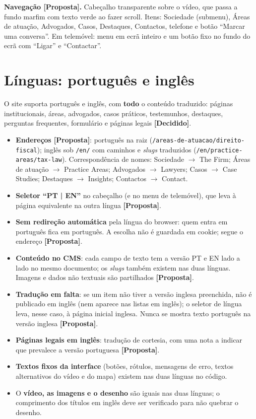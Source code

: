 \documentclass[11pt,a4paper]{article}
\newcommand{\decidido}{\textcolor{verde700}{\textbf{[Decidido]}}}
\newcommand{\proposta}{\textcolor{bronze}{\textbf{[Proposta]}}}
\begin{document}
\textbf{Navegação \proposta.} Cabeçalho transparente sobre o vídeo, que passa a fundo marfim com texto verde ao fazer scroll. Itens: Sociedade (submenu), Áreas de atuação, Advogados, Casos, Destaques, Contactos, telefone e botão ``Marcar uma conversa''. Em telemóvel: menu em ecrã inteiro e um botão fixo no fundo do ecrã com ``Ligar'' e ``Contactar''.

\section{Línguas: português e inglês}\label{sec:linguas}

O site suporta português e inglês, com \textbf{todo} o conteúdo traduzido: páginas institucionais, áreas, advogados, casos práticos, testemunhos, destaques, perguntas frequentes, formulário e páginas legais \decidido.

\begin{itemize}
  \item \textbf{Endereços \proposta}: português na raiz (\texttt{/areas-de-atuacao/direito-fiscal}); inglês sob \texttt{/en/} com caminhos e \textit{slugs} traduzidos (\texttt{/en/practice-areas/tax-law}). Correspondência de nomes: Sociedade $\rightarrow$ The Firm; Áreas de atuação $\rightarrow$ Practice Areas; Advogados $\rightarrow$ Lawyers; Casos $\rightarrow$ Case Studies; Destaques $\rightarrow$ Insights; Contactos $\rightarrow$ Contact.
  \item \textbf{Seletor ``PT | EN''} no cabeçalho (e no menu de telemóvel), que leva à página equivalente na outra língua \proposta.
  \item \textbf{Sem redireção automática} pela língua do browser: quem entra em português fica em português. A escolha não é guardada em cookie; segue o endereço \proposta.
  \item \textbf{Conteúdo no CMS}: cada campo de texto tem a versão PT e EN lado a lado no mesmo documento; os \textit{slugs} também existem nas duas línguas. Imagens e dados não textuais são partilhados \proposta.
  \item \textbf{Tradução em falta}: se um item não tiver a versão inglesa preenchida, não é publicado em inglês (nem aparece nas listas em inglês); o seletor de língua leva, nesse caso, à página inicial inglesa. Nunca se mostra texto português na versão inglesa \proposta.
  \item \textbf{Páginas legais em inglês}: tradução de cortesia, com uma nota a indicar que prevalece a versão portuguesa \proposta.
  \item \textbf{Textos fixos da interface} (botões, rótulos, mensagens de erro, textos alternativos do vídeo e do mapa) existem nas duas línguas no código.
  \item O \textbf{vídeo, as imagens e o desenho} são iguais nas duas línguas; o comprimento dos títulos em inglês deve ser verificado para não quebrar o desenho.
\end{itemize}
\end{document}
